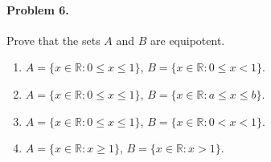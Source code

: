 \documentclass[10pt]{article}
\begin{document}
        \paragraph{Problem 6.} Prove that the sets $A$ and $B$ are equipotent.
        \begin{enumerate}
                \item $A = \{x \in \mathbb{R}: 0 \leq x \leq 1\}$, $B = \{x \in \mathbb{R}: 0 \leq x < 1\}$.
                \item $A = \{x \in \mathbb{R}: 0 \leq x \leq 1\}$, $B = \{x \in \mathbb{R}: a \leq x \leq b\}$.
                \item $A = \{x \in \mathbb{R}: 0 \leq x \leq 1\}$, $B = \{x \in \mathbb{R}: 0 < x < 1\}$.
                \item $A = \{x \in \mathbb{R}: x \geq 1\}$, $B = \{x \in \mathbb{R}: x > 1\}$.
        \end{enumerate}
\end{document}
